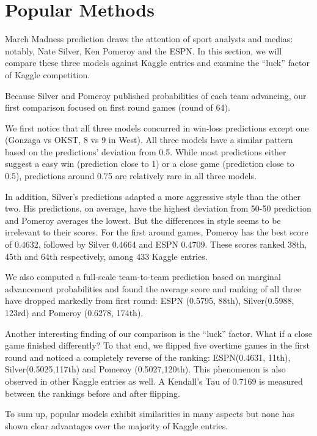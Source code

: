 \documentclass[10pt,a4paper]{article}
\begin{document}
\section{Popular Methods}
March Madness prediction draws the attention of sport analysts and medias: notably, Nate Silver, Ken Pomeroy and the ESPN. In this section, we will compare these three models against Kaggle entries and examine the ``luck'' factor of Kaggle competition.

Because Silver and Pomeroy published probabilities of each team advancing, our first comparison focused on first round games (round of 64). 
  
We first notice that all three models concurred in win-loss predictions except one (Gonzaga vs OKST, 8 vs 9 in West). All three models have a similar pattern based on the predictions' deviation from 0.5. While most predictions either suggest a easy win (prediction close to 1) or a close game (prediction close to 0.5), predictions around 0.75 are relatively rare in all three models.

In addition, Silver's predictions adapted a more aggressive style than the other two. His predictions, on average, have the highest deviation from 50-50 prediction and Pomeroy averages the lowest. But the differences in style seems to be irrelevant to their scores. For the first around games, Pomeroy has the best score of 0.4632, followed by Silver 0.4664 and ESPN 0.4709. These scores ranked 38th, 45th and 64th respectively, among 433 Kaggle entries. 

We also computed a full-scale team-to-team prediction based on marginal advancement probabilities and found the average score and ranking of all three have dropped markedly from first round: ESPN (0.5795, 88th), Silver(0.5988, 123rd) and Pomeroy (0.6278, 174th). 

Another interesting finding of our comparison is the ``luck'' factor. What if a close game finished differently? To that end, we flipped five overtime games in the first round and noticed a completely reverse of the ranking: ESPN(0.4631, 11th), Silver(0.5025,117th) and Pomeroy (0.5027,120th). This phenomenon is also observed in other Kaggle entries as well. A Kendall's Tau of 0.7169 is measured between the rankings before and after flipping. 

To sum up, popular models exhibit similarities in many aspects but none has shown clear advantages over the majority of Kaggle entries. 
 
\end{document}
